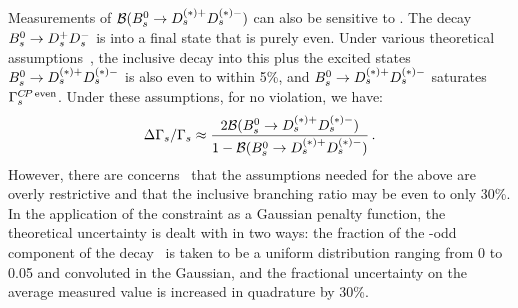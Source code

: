{Measurements of ${\cal B}(B^0_s \to D_s^{(*)+} D_s^{(*)-})$ can 
also be sensitive to \DGs.
The decay $B^0_s \to D_s^{+} D_s^{-}$ is into
a final state that is purely \CP even. 
Under various theoretical assumptions~\cite{Aleksan:1993qp,Dunietz:2000cr}, the
inclusive decay into this plus the excited states
$B^0_s \to D_s^{(*)+} D_s^{(*)-}$ is also \CP even
to within 5\%, and 
$B^0_s \to D_s^{(*)+} D_s^{(*)-}$ saturates
$\Gamma_{s}^{C\!P \thinspace {\rm even}}$.
Under these assumptions, for no \CP violation, we have: 
\begin{equation}
\DGGs \approx
\frac{2 \BR{\Bs \to D_s^{(*)+} D_s^{(*)-}}}
{1 - \BR{\Bs \to D_s^{(*)+} D_s^{(*)-}}} \,.
\labe{dGsBr}
\end{equation}
However, there are concerns~\cite{Nierste_private:2006} 
that the assumptions needed
for the above are overly restrictive and that the inclusive branching
ratio may be \CP even to only 30\%.
In the application of the constraint as a Gaussian penalty
function, the theoretical uncertainty is dealt with in two ways:
the fraction of the \CP-odd component of the decay~\cite{Dunietz:2000cr} 
is taken
to be a uniform distribution ranging from 0 to 0.05 and
convoluted in the Gaussian, and the fractional uncertainty on the
average measured value is increased in quadrature by 
30\%.

}
